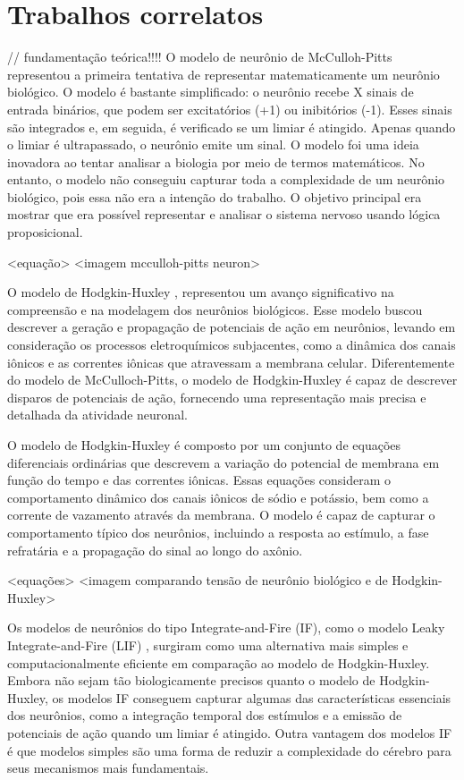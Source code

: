 \chapter{Trabalhos correlatos}

// fundamentação teórica!!!!
O modelo de neurônio de McCulloh-Pitts \cite{mccullochLogical1943} representou a primeira tentativa de representar matematicamente
um neurônio biológico. O modelo é bastante simplificado: o neurônio recebe X sinais de entrada binários, que podem ser
excitatórios (+1) ou inibitórios (-1). Esses sinais são integrados e, em seguida, é verificado se um limiar é atingido. Apenas
quando o limiar é ultrapassado, o neurônio emite um sinal. O modelo foi uma ideia inovadora ao tentar analisar a biologia por meio
de termos matemáticos. No entanto, o modelo não conseguiu capturar toda a complexidade de um neurônio biológico, pois essa não era
a intenção do trabalho. O objetivo principal era mostrar que era possível representar e analisar o sistema nervoso usando lógica
proposicional.

<equação>
<imagem mcculloh-pitts neuron>

O modelo de Hodgkin-Huxley \cite{hodgkinQuantitative1952}, representou um avanço significativo na compreensão e na modelagem dos
neurônios biológicos. Esse modelo buscou descrever a geração e propagação de potenciais de ação em neurônios, levando em
consideração os processos eletroquímicos subjacentes, como a dinâmica dos canais iônicos e as correntes iônicas que atravessam a
membrana celular. Diferentemente do modelo de McCulloch-Pitts, o modelo de Hodgkin-Huxley é capaz de descrever disparos de
potenciais de ação, fornecendo uma representação mais precisa e detalhada da atividade neuronal.

O modelo de Hodgkin-Huxley é composto por um conjunto de equações diferenciais ordinárias que descrevem a variação do potencial de
membrana em função do tempo e das correntes iônicas. Essas equações consideram o comportamento dinâmico dos canais iônicos de
sódio e potássio, bem como a corrente de vazamento através da membrana. O modelo é capaz de capturar o comportamento típico dos
neurônios, incluindo a resposta ao estímulo, a fase refratária e a propagação do sinal ao longo do axônio.

<equações>
<imagem comparando tensão de neurônio biológico e de Hodgkin-Huxley>

Os modelos de neurônios do tipo Integrate-and-Fire (IF), como o modelo Leaky Integrate-and-Fire (LIF) \cite{burkitt2006review},
surgiram como uma alternativa mais simples e computacionalmente eficiente em comparação ao modelo de Hodgkin-Huxley. Embora não
sejam tão biologicamente precisos quanto o modelo de Hodgkin-Huxley, os modelos IF conseguem capturar algumas das características
essenciais dos neurônios, como a integração temporal dos estímulos e a emissão de potenciais de ação quando um limiar é atingido.
Outra vantagem dos modelos IF é que modelos simples são uma forma de reduzir a complexidade do cérebro para seus mecanismos mais
fundamentais.


